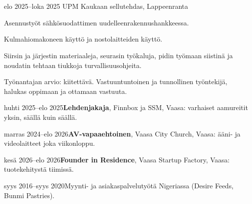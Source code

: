 \documentclass[a4paper,11pt]{article}
\begin{document}
\section{}
\begin{cventry}{elo 2025--loka 2025}{}
  UPM Kaukaan sellutehdas, Lappeenranta\par
  Asennustyöt sähkösuodattimen uudelleenrakennushankkeessa.\par
  Kulmahiomakoneen käyttö ja nostolaitteiden käyttö.\par
  Siirsin ja järjestin materiaaleja, seurasin työkaluja, pidin työmaan siistinä ja noudatin tehtaan tiukkoja turvallisuusohjeita.\par
  Työnantajan arvio: kiitettävä. Vastuuntuntoinen ja tunnollinen työntekijä, halukas oppimaan ja ottamaan vastuuta.
\end{cventry}
\begin{cventry}{huhti 2025--elo 2025}{\textbf{Lehdenjakaja}, Finnbox ja SSM, Vaasa: varhaiset aamureitit yksin, säällä kuin säällä.}
\end{cventry}
\begin{cventry}{marras 2024--elo 2026}{\textbf{AV-vapaaehtoinen}, Vaasa City Church, Vaasa: ääni- ja videolaitteet joka viikonloppu.}
\end{cventry}
\begin{cventry}{kesä 2026--elo 2026}{\textbf{Founder in Residence}, Vaasa Startup Factory, Vaasa: tuotekehitystä tiimissä.}
\end{cventry}
\begin{cventry}{syys 2016--syys 2020}{Myynti- ja asiakaspalvelutyötä Nigeriassa (Desire Feeds, Bunmi Pastries).}
\end{cventry}

\section{}

\section{}
\end{document}
